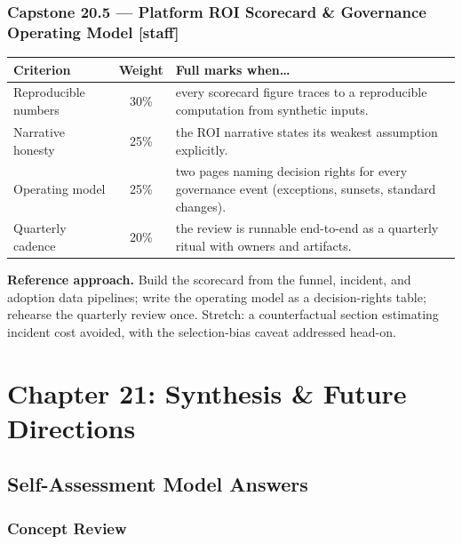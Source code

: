 \subsubsection*{Capstone 20.5 --- Platform ROI Scorecard \& Governance Operating Model [staff]}
\begin{center}\small
\begin{tabularx}{\textwidth}{l c X}
\toprule
\textbf{Criterion} & \textbf{Weight} & \textbf{Full marks when\ldots} \\
\midrule
Reproducible numbers & 30\% & every scorecard figure traces to a reproducible computation from synthetic inputs. \\
Narrative honesty & 25\% & the ROI narrative states its weakest assumption explicitly. \\
Operating model & 25\% & two pages naming decision rights for every governance event (exceptions, sunsets, standard changes). \\
Quarterly cadence & 20\% & the review is runnable end-to-end as a quarterly ritual with owners and artifacts. \\
\bottomrule
\end{tabularx}
\end{center}
\textbf{Reference approach.} Build the scorecard from the funnel, incident,
and adoption data pipelines; write the operating model as a decision-rights
table; rehearse the quarterly review once. Stretch: a counterfactual
section estimating incident cost avoided, with the selection-bias caveat
addressed head-on.

\section{Chapter 21: Synthesis \& Future Directions}
\label{sec:sol-ch21}

\subsection{Self-Assessment Model Answers}

\subsubsection*{Concept Review}

